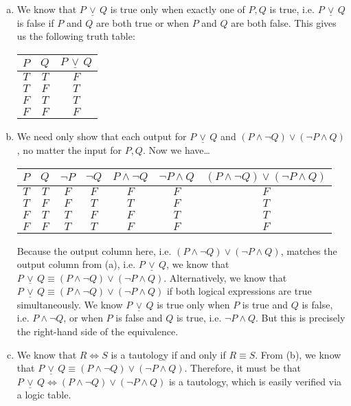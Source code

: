 \documentclass[11pt,letterpaper]{article}
\newcommand{\xor}{\,\underline{\vee}\,}
\begin{document}
\sol 
\begin{enumerate}[(a)]
\item We know that $P \xor Q$ is true only when exactly one of $P, Q$ is true, i.e. $P \xor Q$ is false if $P$ and $Q$ are both true or when $P$ and $Q$ are both false. This gives us the following truth table: \par
	\begin{table}[h]
	\centering
	\begin{tabular}{ccc}
	$P$ & $Q$ & $P \xor Q$ \\ \hline
	$T$ & $T$ & $F$ \\
	$T$ & $F$ & $T$ \\
	$F$ & $T$ & $T$ \\
	$F$ & $F$ & $F$ 
	\end{tabular}
	\end{table} \pspace

\item We need only show that each output for $P \xor Q$ and $(P \wedge \neg Q) \vee (\neg P \wedge Q)$, no matter the input for $P, Q$. Now we have\dots \par
	\begin{table}[h]
	\centering
	\begin{tabular}{ccccccc}
	$P$ & $Q$ & $\neg P$ & $\neg Q$ & $P \wedge \neg Q$ & $\neg P \wedge Q$ & $(P \wedge \neg Q) \vee (\neg P \wedge Q)$ \\ \hline
	$T$ & $T$ & $F$ & $F$ & $F$ & $F$ & $F$ \\
	$T$ & $F$ & $F$ & $T$ & $T$ & $F$ & $T$ \\
	$F$ & $T$ & $T$ & $F$ & $F$ & $T$ & $T$ \\
	$F$ & $F$ & $T$ & $T$ & $F$ & $F$ & $F$
	\end{tabular}
	\end{table}
Because the output column here, i.e. $(P \wedge \neg Q) \vee (\neg P \wedge Q)$, matches the output column from (a), i.e. $P \xor Q$, we know that $P \xor Q \equiv (P \wedge \neg Q) \vee (\neg P \wedge Q)$. Alternatively, we know that $P \xor Q \equiv (P \wedge \neg Q) \vee (\neg P \wedge Q)$ if both logical expressions are true simultaneously. We know $P \xor Q$ is true only when $P$ is true and $Q$ is false, i.e. $P \wedge \neg Q$, or when $P$ is false and $Q$ is true, i.e. $\neg P \wedge Q$. But this is precisely the right-hand side of the equivalence. \pspace

\item We know that $R \iff S$ is a tautology if and only if $R \equiv S$. From (b), we know that $P \xor Q \equiv (P \wedge \neg Q) \vee (\neg P \wedge Q)$. Therefore, it must be that $P \xor Q \iff (P \wedge \neg Q) \vee (\neg P \wedge Q)$ is a tautology, which is easily verified via a logic table. \pspace


\end{enumerate}
\end{document}
